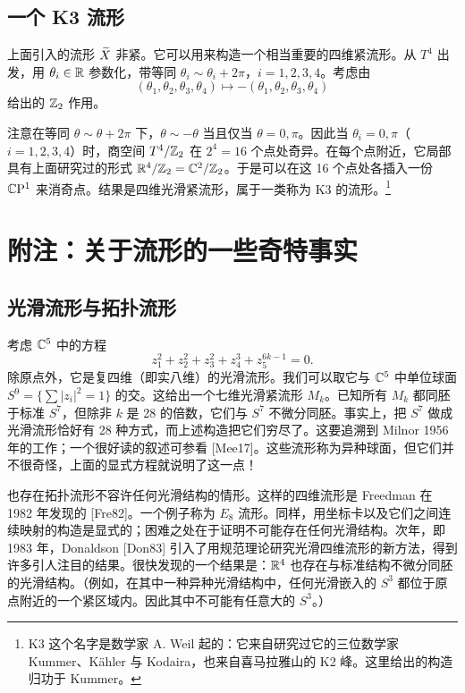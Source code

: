 \subsection{一个 K3 流形}

上面引入的流形 $\widetilde{X}$ 非紧。它可以用来构造一个相当重要的四维紧流形。从 $T^4$ 出发，用 $\theta_i\in\mathbb{R}$ 参数化，带等同 $\theta_i\sim\theta_i+2\pi$，$i=1,2,3,4$。考虑由
\begin{equation}
(\theta_1,\theta_2,\theta_3,\theta_4)\mapsto-(\theta_1,\theta_2,\theta_3,\theta_4) \tag{2.50}
\end{equation}
给出的 $\mathbb{Z}_2$ 作用。

注意在等同 $\theta\sim\theta+2\pi$ 下，$\theta\sim-\theta$ 当且仅当 $\theta=0,\pi$。因此当 $\theta_i=0,\pi$（$i=1,2,3,4$）时，商空间 $T^4/\mathbb{Z}_2$ 在 $2^4=16$ 个点处奇异。在每个点附近，它局部具有上面研究过的形式 $\mathbb{R}^4/\mathbb{Z}_2=\mathbb{C}^2/\mathbb{Z}_2$。于是可以在这 16 个点处各插入一份 $\mathbb{C}\mathrm{P}^1$ 来消奇点。结果是四维光滑紧流形，属于一类称为 K3 的流形。\footnote{K3 这个名字是数学家 A. Weil 起的：它来自研究过它的三位数学家 Kummer、Kähler 与 Kodaira，也来自喜马拉雅山的 K2 峰。这里给出的构造归功于 Kummer。}


\section{附注：关于流形的一些奇特事实}

\subsection{光滑流形与拓扑流形}

考虑 $\mathbb{C}^5$ 中的方程
\begin{equation}
z_1^2+z_2^2+z_3^2+z_4^3+z_5^{6k-1}=0. \tag{2.51}
\end{equation}
除原点外，它是复四维（即实八维）的光滑流形。我们可以取它与 $\mathbb{C}^5$ 中单位球面 $S^9=\{\sum|z_i|^2=1\}$ 的交。这给出一个七维光滑紧流形 $M_k$。已知所有 $M_k$ 都同胚于标准 $S^7$，但除非 $k$ 是 28 的倍数，它们与 $S^7$ 不微分同胚。事实上，把 $S^7$ 做成光滑流形恰好有 28 种方式，而上述构造把它们穷尽了。这要追溯到 Milnor 1956 年的工作；一个很好读的叙述可参看 [Mee17]。这些流形称为异种球面，但它们并不很奇怪，上面的显式方程就说明了这一点！

也存在拓扑流形不容许任何光滑结构的情形。这样的四维流形是 Freedman 在 1982 年发现的 [Fre82]。一个例子称为 $E_8$ 流形。同样，用坐标卡以及它们之间连续映射的构造是显式的；困难之处在于证明不可能存在任何光滑结构。次年，即 1983 年，Donaldson [Don83] 引入了用规范理论研究光滑四维流形的新方法，得到许多引人注目的结果。很快发现的一个结果是：$\mathbb{R}^4$ 也存在与标准结构不微分同胚的光滑结构。（例如，在其中一种异种光滑结构中，任何光滑嵌入的 $S^3$ 都位于原点附近的一个紧区域内。因此其中不可能有任意大的 $S^3$。）

